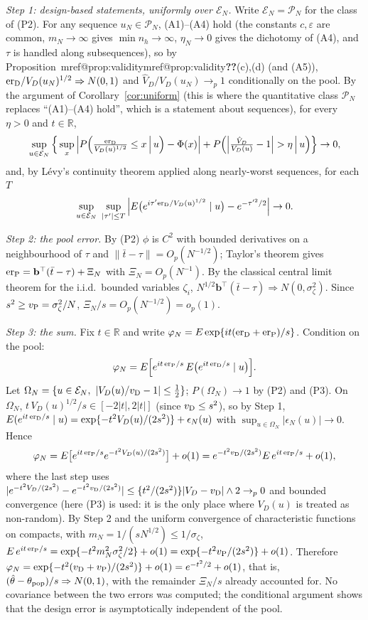 \documentclass[pdflatex,sn-mathphys-num,iicol]{sn-jnl}
\makeatletter
\theoremstyle{thmstyleone}
\theoremstyle{thmstyletwo}
\theoremstyle{thmstylethree}
\newcommand{\Mref}[1]{\ifcsname mref@#1\endcsname\csname mref@#1\endcsname\else\textbf{??}\fi}
\makeatother
\begin{document}
\emph{Step 1: design-based statements, uniformly over $\mathcal E_N$.} Write $\mathcal E_N=\mathcal P_N$ for the class of (P2). For any sequence $u_N\in\mathcal P_N$, (A1)--(A4) hold (the constants $c,\varepsilon$ are common, $m_N\to\infty$ gives $\min n_h\to\infty$, $\eta_N\to0$ gives the dichotomy of (A4), and $\tau$ is handled along subsequences), so by Proposition~\Mref{prop:validity}(c),(d) (and (A5)), $\mathrm{er}_{\rm D}/V_D(u_N)^{1/2}\Rightarrow N(0,1)$ and $\hat V_D/V_D(u_N)\to_p1$ conditionally on the pool. By the argument of Corollary~\ref{cor:uniform} (this is where the quantitative class $\mathcal P_N$ replaces ``(A1)--(A4) hold'', which is a statement about sequences), for every $\eta>0$ and $t\in\mathbb R$,
\[
\sup_{u\in\mathcal E_N}\Big\{\sup_x\Big|P\Big(\tfrac{\mathrm{er}_{\rm D}}{V_D(u)^{1/2}}\le x\,\Big|\,u\Big)-\Phi(x)\Big|+P\Big(\Big|\tfrac{\hat V_D}{V_D(u)}-1\Big|>\eta\,\Big|\,u\Big)\Big\}\to0,
\]
and, by L\'evy's continuity theorem applied along nearly-worst sequences, for each $T$
\[
\sup_{u\in\mathcal E_N}\ \sup_{|\tau'|\le T}\Big|E\big(e^{i\tau'\mathrm{er}_{\rm D}/V_D(u)^{1/2}}\mid u\big)-e^{-\tau'^2/2}\Big|\to0.
\]

\emph{Step 2: the pool error.} By (P2) $\phi$ is $C^2$ with bounded derivatives on a neighbourhood of $\tau$ and $\|\bar t-\tau\|=O_p(N^{-1/2})$; Taylor's theorem gives $\mathrm{er}_{\rm P}=\mathbf b^\top(\bar t-\tau)+\Xi_N$ with $\Xi_N=O_p(N^{-1})$. By the classical central limit theorem for the i.i.d.\ bounded variables $\zeta_i$, $N^{1/2}\mathbf b^\top(\bar t-\tau)\Rightarrow N(0,\sigma^2_\zeta)$. Since $s^2\ge v_{\rm P}=\sigma_\zeta^2/N$, $\Xi_N/s=O_p(N^{-1/2})=o_p(1)$.

\emph{Step 3: the sum.} Fix $t\in\mathbb R$ and write $\varphi_N=E\exp\{it(\mathrm{er}_{\rm D}+\mathrm{er}_{\rm P})/s\}$. Condition on the pool:
\[
\varphi_N=E\Big[e^{it\,\mathrm{er}_{\rm P}/s}\,E\big(e^{it\,\mathrm{er}_{\rm D}/s}\mid u\big)\Big].
\]
Let $\Omega_N=\{u\in\mathcal E_N,\ |V_D(u)/v_{\rm D}-1|\le\tfrac12\}$; $P(\Omega_N)\to1$ by (P2) and (P3). On $\Omega_N$, $t\,V_D(u)^{1/2}/s\in[-2|t|,2|t|]$ (since $v_{\rm D}\le s^2$), so by Step 1, $E(e^{it\,\mathrm{er}_{\rm D}/s}\mid u)=\exp\{-t^2V_D(u)/(2s^2)\}+\epsilon_N(u)$ with $\sup_{u\in\Omega_N}|\epsilon_N(u)|\to0$. Hence
\[
\varphi_N=E\big[e^{it\,\mathrm{er}_{\rm P}/s}e^{-t^2V_D(u)/(2s^2)}\big]+o(1)=e^{-t^2v_{\rm D}/(2s^2)}E\,e^{it\,\mathrm{er}_{\rm P}/s}+o(1),
\]
where the last step uses $|e^{-t^2V_D/(2s^2)}-e^{-t^2v_{\rm D}/(2s^2)}|\le\{t^2/(2s^2)\}|V_D-v_{\rm D}|\wedge2\to_p0$ and bounded convergence (here (P3) is used: it is the only place where $V_D(u)$ is treated as non-random). By Step 2 and the uniform convergence of characteristic functions on compacts, with $m_N=1/(sN^{1/2})\le1/\sigma_\zeta$, $E\,e^{it\,\mathrm{er}_{\rm P}/s}=\exp\{-t^2m_N^2\sigma_\zeta^2/2\}+o(1)=\exp\{-t^2v_{\rm P}/(2s^2)\}+o(1)$. Therefore $\varphi_N=\exp\{-t^2(v_{\rm D}+v_{\rm P})/(2s^2)\}+o(1)=e^{-t^2/2}+o(1)$, that is, $(\hat\theta-\theta_{\rm pop})/s\Rightarrow N(0,1)$, with the remainder $\Xi_N/s$ already accounted for. No covariance between the two errors was computed; the conditional argument shows that the design error is asymptotically independent of the pool.
\end{document}
